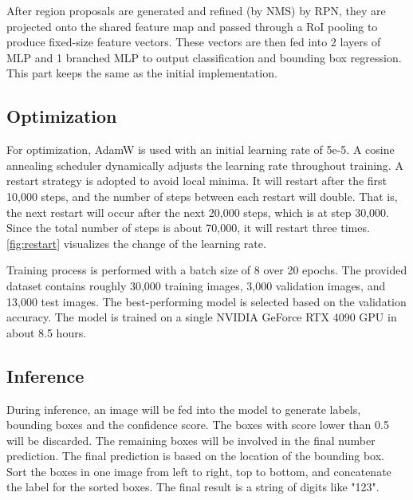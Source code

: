 \documentclass[10pt,twocolumn,letterpaper]{article}
\begin{document}
After region proposals are generated and refined (by NMS) by RPN, they are
projected onto the shared feature map and passed through a RoI pooling to
produce fixed-size feature vectors. These vectors are then fed into 2 layers
of MLP and 1 branched MLP to output classification and bounding box regression.
This part keeps the same as the initial implementation.

\subsection{Optimization}

For optimization, AdamW is used with an initial learning rate of 5e-5. A
cosine annealing scheduler dynamically adjusts the learning rate throughout
training. A restart strategy is adopted to avoid local minima. It will restart
after the first 10,000 steps, and the number of steps between each restart
will double. That is, the next restart will occur after the next 20,000 steps,
which is at step 30,000. Since the total number of steps is about 70,000,
it will restart three times. \cref{fig:restart} visualizes the
change of the learning rate.

Training process is performed with a batch size of 8 over 20 epochs. The
provided dataset contains roughly 30,000 training images, 3,000 validation
images, and 13,000 test images. The best-performing model is selected based
on the validation accuracy. The model is trained on a single NVIDIA GeForce
RTX 4090 GPU in about 8.5 hours.

\subsection{Inference}

During inference, an image will be fed into the model to generate labels,
bounding boxes and the confidence score. The boxes with score lower than 0.5
will be discarded. The remaining boxes will be involved in the final number
prediction. The final prediction is based on the location of the bounding
box. Sort the boxes in one image from left to right, top to bottom, and
concatenate the label for the sorted boxes. The final result is a string of
digits like "123".
\end{document}
